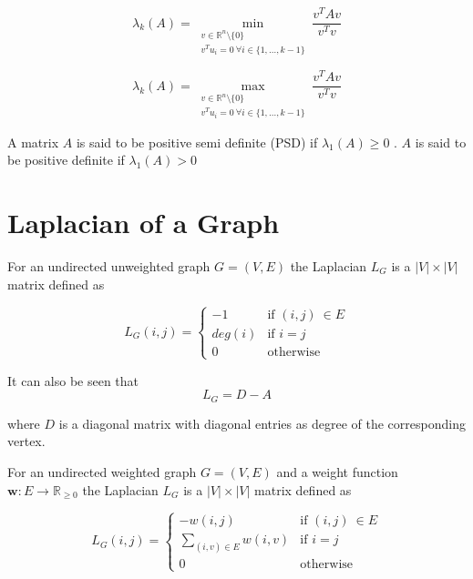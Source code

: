 
\begin{Bf}
 \[ \lambda_k(A) = \min_{\substack{v \in \mathbb{R}^n \setminus \{0\}\\ v^Tu_i = 0 \ \forall i \in \{1, \dots , k-1\}}} \frac{v^T A v}{v^Tv} \]
 
 \[ \lambda_k(A) = \max_{\substack{v \in \mathbb{R}^n \setminus \{0\}\\ v^Tu_i = 0 \ \forall i \in \{1, \dots , k-1\}}} \frac{v^T A v}{v^Tv} \]
\end{Bf}

\begin{Bf}
 A matrix $A$ is said to be positive semi definite (PSD) if $\lambda_1(A) \geq 0$ . $A$ is said to be positive definite if $\lambda_1(A) > 0$
\end{Bf}


\section{Laplacian of a Graph}

\begin{Bd}[Laplacian]
 For an undirected unweighted graph $G = (V, E)$ the Laplacian $L_G$ is a $|V| \times |V|$ matrix defined as 
 
  \[
    L_G(i, j) = 
\begin{cases}
    -1& \text{if } (i, j) \ \in E\\
    deg(i)& \text{if } i = j\\
    0              & \text{otherwise}
\end{cases}
\]

It can also be seen that 
$$L_G = D - A$$

where $D$ is a diagonal matrix with diagonal entries as degree of the corresponding vertex. 

 \end{Bd}

 \begin{Bd}
 For an undirected weighted graph $G = (V, E)$ and a weight function $\textbf{w}: E \rightarrow \mathbb{R}_{\geq 0}$ the Laplacian $L_G$ is a $|V| \times |V|$ matrix defined as 
 
  \[
    L_G(i, j) = 
\begin{cases}
    -w(i,j)& \text{if } (i, j) \ \in E\\
    \displaystyle\sum_{(i,v) \in E} w(i, v)& \text{if } i = j\\
    0              & \text{otherwise}
\end{cases}
\]

\end{Bd}

